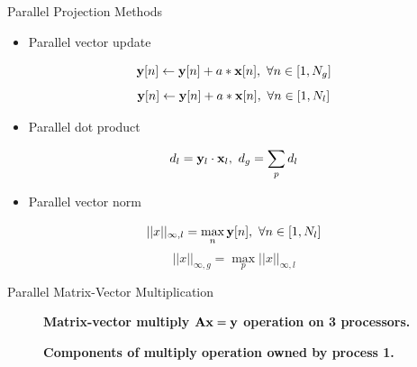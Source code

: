 \documentclass{beamer}
\begin{document}
\begin{frame}{Parallel Projection Methods}
  
  \begin{itemize}
  \item Parallel vector update
  \end{itemize}
  \[
  \mathbf{y}[n] \leftarrow \mathbf{y}[n] + a * \mathbf{x}[n],\ \forall n \in
     [1,N_g]
  \]
  \[
  \mathbf{y}[n] \leftarrow \mathbf{y}[n] + a * \mathbf{x}[n],\ \forall n \in
     [1,N_l]
  \]
  
  \begin{itemize}
  \item Parallel dot product
  \end{itemize}
  \[
  d_l = \mathbf{y}_l \cdot \mathbf{x}_l,\ d_g = \sum_p d_l
  \]

  \begin{itemize}
  \item Parallel vector norm
  \end{itemize}
  \[
  ||x||_{\infty,l} = \max_n \ve{y}[n],\ \forall n \in [1,N_l]
  \]
  \[
  ||x||_{\infty,g} = \max_p ||x||_{\infty,l}
  \]
  
\end{frame}

\begin{frame}{Parallel Matrix-Vector Multiplication}

  \begin{figure}[htpb!]
    \begin{center}
      \scalebox{0.6}{  }
    \end{center}
    \caption{\textbf{Matrix-vector multiply $\mathbf{A}\mathbf{x}=\mathbf{y}$
        operation on 3 processors.}
      \label{fig:partitioned_matvec_multiply} }
  \end{figure}

  \begin{figure}[htpb!]
    \begin{center}
      \scalebox{0.7}{  }
    \end{center}
    \caption{\textbf{Components of multiply operation owned by process
        1.} }
    \label{fig:matvec_proc_1}
  \end{figure}

\end{frame}
\end{document}
